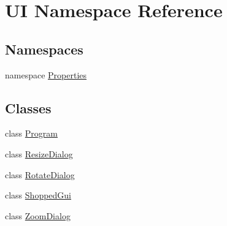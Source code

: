 \hypertarget{namespace_u_i}{
\section{UI Namespace Reference}
\label{namespace_u_i}
}
\subsection*{Namespaces}
\begin{DoxyCompactItemize}
\item 
namespace \hyperlink{namespace_u_i_1_1_properties}{Properties}
\end{DoxyCompactItemize}
\subsection*{Classes}
\begin{DoxyCompactItemize}
\item 
class \hyperlink{class_u_i_1_1_program}{Program}
\item 
class \hyperlink{class_u_i_1_1_resize_dialog}{ResizeDialog}
\item 
class \hyperlink{class_u_i_1_1_rotate_dialog}{RotateDialog}
\item 
class \hyperlink{class_u_i_1_1_shopped_gui}{ShoppedGui}
\item 
class \hyperlink{class_u_i_1_1_zoom_dialog}{ZoomDialog}
\end{DoxyCompactItemize}
